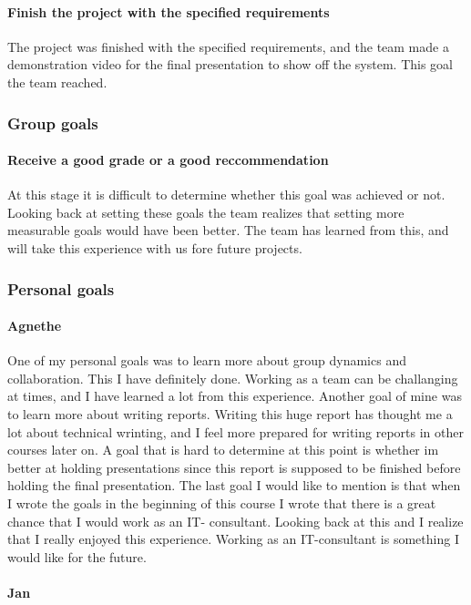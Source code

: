 \paragraph{Finish the project with the specified requirements}
The project was finished with the specified requirements, and the team made a demonstration video for the final presentation to show off the system. This goal the team reached. 

\subsubsection{Group goals}
\paragraph{Receive a good grade or a good reccommendation}
At this stage it is difficult to determine whether this goal was achieved or not. Looking back at setting these goals the team realizes that setting more measurable goals would have been better. The team has learned from this, and will take this experience with us fore future projects.

\subsubsection{Personal goals}

\paragraph{Agnethe}
One of my personal goals was to learn more about group dynamics and collaboration. This I have definitely done. Working as a team can be challanging at times, and I have learned a lot from this experience. Another goal of mine was to learn more about writing reports. Writing this huge report has thought me a lot about technical wrinting, and I feel more prepared for writing reports in other courses later on. A goal that is hard to determine at this point is whether im better at holding presentations since this report is supposed to be finished before holding the final presentation. The last goal I would like to mention is that when I wrote the goals in the beginning of this course I wrote that  there is a great chance that I would work as an IT- consultant. Looking back at this and I realize that I really enjoyed this experience. Working as an IT-consultant is something I would like for the future. 

\paragraph{Jan}

